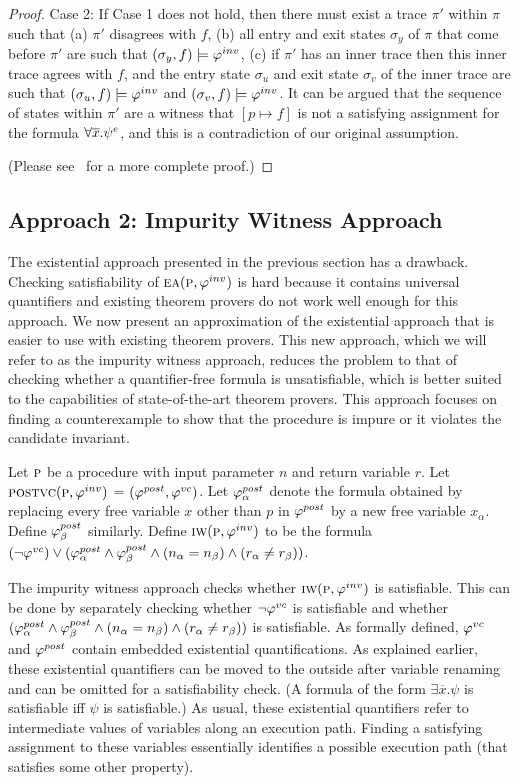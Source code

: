 \begin{proof}
Case 2: If Case 1 does not hold,
then there must exist a trace $\pi'$ within $\pi$ such that
(a) $\pi'$ disagrees with $f$, (b) all entry and exit states $\sigma_y$ of
$\pi$ that come before $\pi'$ are such that $(\sigma_y, f) \models \varphi^{inv}$, (c)
if $\pi'$ has an inner trace then this inner trace agrees with $f$, and 
the entry state $\sigma_u$ and exit state
$\sigma_v$ of the inner trace are such that
$(\sigma_u, f) \models \varphi^{inv}$ and
 $(\sigma_v, f) \models \varphi^{inv}$. It
can be argued that the sequence of states within $\pi'$ are a witness that $[p
  \mapsto f]$ is not a satisfying assignment for the formula
$\forall \overline{x}. \psi^e$, and this is a contradiction of our
original assumption.

(Please see~\cite{CheckingOP:arxiv} for a more complete proof.)

\end{proof}

\subsection{Approach 2: Impurity Witness Approach}

The existential approach presented in the previous section has a drawback. Checking satisfiability of $\textsc{ea}(\textsc{p},\varphi^{inv})$
is hard because it contains universal quantifiers and existing theorem provers do not work well enough for this
approach. We now present an approximation of the existential approach that is easier to use with existing theorem
provers. This new approach, which we will refer to as the impurity witness approach, reduces the problem to
that of checking whether a quantifier-free formula is unsatisfiable, which is better suited to the capabilities of
state-of-the-art theorem provers. This approach focuses on finding a counterexample to show that the
procedure is impure or it violates the candidate invariant.

Let $\textsc{p}$ be a procedure with input parameter $n$ and return variable $r$.
Let $\textsc{postvc}({\textsc{p}},{\varphi^{inv}})$ = $(\varphi^{post},\varphi^{vc})$.
Let $\varphi^{post}_\alpha$ denote the formula obtained by replacing every free variable $x$ other than $p$ in $\varphi^{post}$
by a new free variable $x_\alpha$. Define $\varphi^{post}_\beta$ similarly.
Define $\textsc{iw}(\textsc{p}, \varphi^{inv})$ to be the formula $(\neg \varphi^{vc}) \vee (\varphi^{post}_\alpha \wedge \varphi^{post}_\beta \wedge (n_\alpha = n_\beta) \wedge (r_\alpha \neq r_\beta))$.

The impurity witness approach checks whether $\textsc{iw}(\textsc{p}, \varphi^{inv})$ is satisfiable. This can be done by separately checking
whether $\neg \varphi^{vc}$ is satisfiable and whether $(\varphi^{post}_\alpha \wedge \varphi^{post}_\beta \wedge (n_\alpha = n_\beta) \wedge (r_\alpha \neq r_\beta))$
is satisfiable. As formally defined, $\varphi^{vc}$ and $\varphi^{post}$ contain embedded existential quantifications. As explained earlier,
these existential quantifiers can be moved to the outside after variable renaming and can be omitted for a satisfiability check.
(A formula of the form $\exists \overline{x}. \psi$ is satisfiable iff $\psi$ is satisfiable.)
As usual, these existential quantifiers refer to intermediate values of variables along an execution path.
Finding a satisfying assignment to these variables essentially identifies a possible execution path (that
satisfies some other property).

